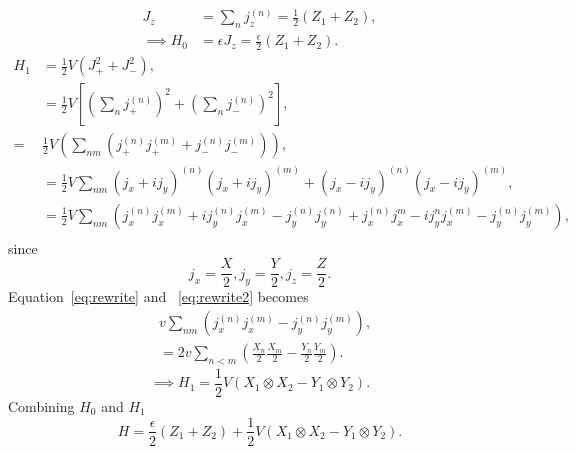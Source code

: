 \begin{equation}
	\label{eq:rewrite}
	\begin{aligned}
		J_z &= \sum_{n} j_z^{(n)} = \frac{1}{2} (Z_1+Z_2),\\
		\implies H_0 &= \epsilon J_z = \frac{\epsilon}{2} (Z_1+Z_2).
	\end{aligned}	
\end{equation}
\begin{equation}
	\label{eq:rewrite2}
	\begin{aligned}
		H_1 &= \frac{1}{2}V(J_+^2 + J_-^2), \\
		    &= \frac{1}{2}V \left[(\sum_n j_+^{(n)})^2 + (\sum_n j_-^{(n)})^2 \right] ,\\
		=& \frac{1}{2}V \left( \sum_{nm} \left( j_+^{(n)}j_+^{(m)} + j_-^{(n)}j_-^{(m)} \right)  \right), \\
		 &= \frac{1}{2}V \sum_{nm} \left( j_x + ij_y \right) ^{(n)}  \left( j_x + ij_y \right) ^{(m)} +  \left( j_x - ij_y \right) ^{(n)}  \left( j_x - ij_y \right) ^{(m)}, \\
		 &= \frac{1}{2} V \sum_{nm} (j_x^{(n)} j_x^{(m)} + ij_y^{(n)}j_x^{(m)} - j_y^{(n)} j_y^{(n)} + j_x^{(n)}j_x^{m} - ij_y^{n}j_x^{(m)} - j_y^{(n)}j_y^{(m)}),\\
	\end{aligned}	
\end{equation}
since 
\[j_x = \frac{X}{2}, j_y = \frac{Y}{2}, j_z = \frac{Z}{2}.\] 
Equation~\eqref{eq:rewrite} and ~\eqref{eq:rewrite2} becomes
\[ 
\begin{aligned}
	& v \sum_{nm} \left( j_x^{(n)}j_x^{(m)} - j_y^{(n)}j_y^{(m)} \right), \\
	&= 2v \sum_{n<m} \left( \frac{X_n}{2}\frac{X_m}{2} - \frac{Y_n}{2}\frac{Y_m}{2} \right).
\end{aligned}\] 
\begin{equation}
	\implies H_1 = \frac{1}{2} V (X_1 \otimes X_2  - Y_1 \otimes Y_2).
\end{equation}
Combining $ H_0 $ and $ H_1 $ 
\begin{equation}
	\label{eq:qubit-hamiltonian-j1-rewrite}
	H =  \frac{\epsilon}{2} (Z_1 + Z_2) + \frac{1}{2} V (X_1 \otimes X_2 - Y_1 \otimes Y_2).
\end{equation}



